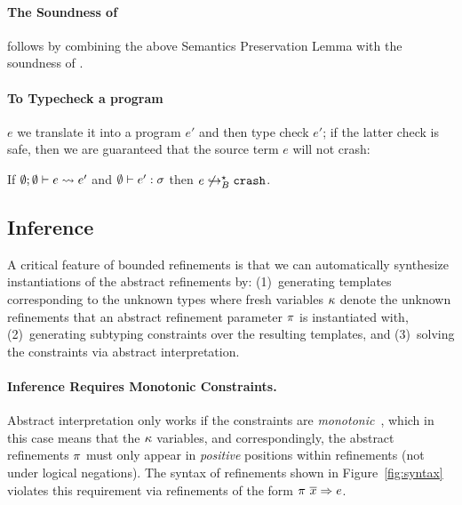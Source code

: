 \paragraph{The Soundness of \boundedcorelan} follows by combining
the above Semantics Preservation
Lemma %
with the soundness of \corelan.

\paragraph{To Typecheck a \boundedcorelan program} $e$ we translate it
into a \corelan program $e'$ and then type check $e'$; if the latter
check is safe, then we are guaranteed that the source term $e$ will
not crash:

\begin{theorem*}[Soundness]
\label{theorem:bounded}
If $ \emptyset; \emptyset \vdash e \rightsquigarrow e'$ and
   $\emptyset \vdash e' : \sigma$
then $e \not \hookrightarrow_B^{\star} {\mathtt{crash}} $.
\end{theorem*}

\subsection{Inference}\label{sec:infer}

A critical feature of bounded refinements is that we can
automatically synthesize instantiations of the abstract
refinements by:
%
(1)~generating templates corresponding to the unknown types
    where fresh variables $\kappa$ denote the unknown refinements
    that an abstract refinement parameter $\pi$ is instantiated
    with,
(2)~generating subtyping constraints over the resulting templates,
    and
(3)~solving the constraints via abstract interpretation.

\paragraph{Inference Requires Monotonic Constraints.}
Abstract interpretation only works if the constraints
are \emph{monotonic}~\citep{cousotcousot77}, which in this case
means that the $\kappa$ variables, and correspondingly,
the abstract refinements $\pi$ must only appear in
\emph{positive} positions within refinements (\ie not
under logical negations).
%
The syntax of refinements shown in Figure~\ref{fig:syntax}
violates this requirement via refinements of the
form ${\pi \ \overline{x}} \Rightarrow e$.
%

